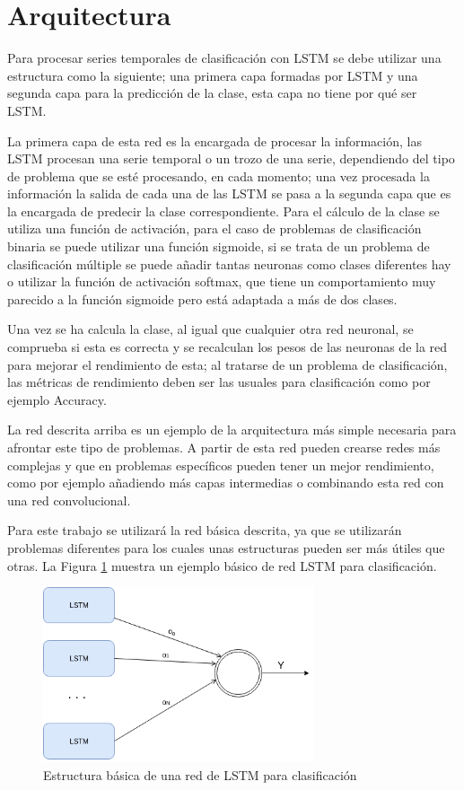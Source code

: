 \section{Arquitectura}
Para procesar series temporales de clasificación con LSTM se debe utilizar una estructura como la siguiente; una primera capa formadas por LSTM y una segunda capa para la predicción de la clase, esta capa no tiene por qué ser LSTM.\newline

La primera capa de esta red es la encargada de procesar la información, las LSTM procesan una serie temporal o un trozo de una serie, dependiendo del tipo de problema que se esté procesando, en cada momento; una vez procesada la información la salida de cada una de las LSTM se pasa a la segunda capa que es la encargada de predecir la clase correspondiente. Para el cálculo de la clase se utiliza una función de activación, para el caso de problemas de clasificación binaria se puede utilizar una función sigmoide, si se trata de un problema de clasificación múltiple se puede añadir tantas neuronas como clases diferentes hay o utilizar la función de activación softmax, que tiene un comportamiento muy parecido a la función sigmoide pero está adaptada a más de dos clases.\newline

Una vez se ha calcula la clase, al igual que cualquier otra red neuronal,  se comprueba si esta es correcta y se recalculan los pesos de las neuronas de la red para mejorar el rendimiento de esta; al tratarse de un problema de clasificación, las métricas de rendimiento deben ser las usuales para clasificación como por ejemplo Accuracy.\newline

La red descrita arriba es un ejemplo de la arquitectura más simple necesaria para afrontar este tipo de problemas. A partir de esta red pueden crearse redes más complejas y que en problemas específicos pueden tener un mejor rendimiento, como por ejemplo añadiendo más capas intermedias o combinando esta red con una red convolucional.\newline

Para este trabajo se utilizará la red básica descrita, ya que se utilizarán problemas diferentes para los cuales unas estructuras pueden ser más útiles que otras. La Figura \ref{fig:32} muestra un ejemplo básico de red LSTM para clasificación.

\begin{figure}[H]
	\centering
	\includegraphics[width=80mm]{imagenes/arquitectura_base.png}
	\caption{Estructura básica de una red de LSTM para clasificación}
	\label{fig:32}
\end{figure}
\verticalspace


